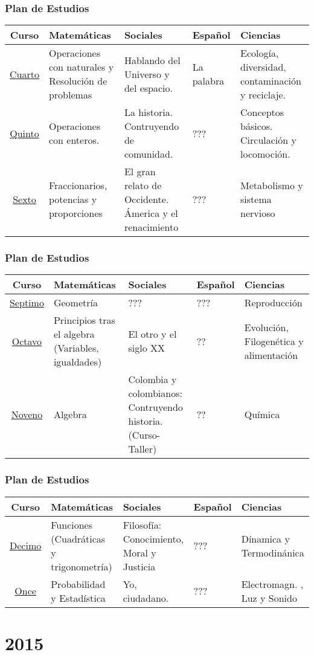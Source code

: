 \documentclass{beamer}
\begin{document}
\begin{frame}
\fontsize{9pt}{10}\selectfont
\frametitle{Plan de Estudios}
\begin{table}
\centering
\begin{tabular}{|c|p{2cm}|p{2cm}|p{2cm}|p{2cm}|}
\hline 
\textbf{Curso} & \textbf{Matem\'aticas} &\textbf{Sociales} &\textbf{Espa\~nol} & \textbf{Ciencias}\\
\hline
\underline{Cuarto} & Operaciones con naturales y Resoluci\'on de problemas   & Hablando del Universo y del espacio.  & La palabra & Ecolog\'ia, diversidad, contaminaci\'on y reciclaje.  \\
\underline{Quinto} & Operaciones con enteros.  & La historia. Contruyendo de comunidad. & ??? &Conceptos b\'asicos. Circulaci\'on y locomoci\'on.  \\
\underline{Sexto} & Fraccionarios, potencias y proporciones & El gran relato de Occidente. \'America y el renacimiento  & ??? & Metabolismo y sistema nervioso \\
\hline
\end{tabular}
\end{table}
\end{frame}


\begin{frame}
\fontsize{9pt}{10}\selectfont
\frametitle{Plan de Estudios}
\begin{table}
\centering
\begin{tabular}{|c|p{2cm}|p{2cm}|p{2cm}|p{2cm}|}
\hline 
\textbf{Curso} & \textbf{Matem\'aticas} &\textbf{Sociales} &\textbf{Espa\~nol} & \textbf{Ciencias}\\
\hline
\underline{Septimo} & Geometr\'ia & ??? & ???& Reproducci\'on \\
\underline{Octavo} & Principios tras el algebra (Variables, igualdades)  &El otro y el siglo XX & ??& Evoluci\'on, Filogen\'etica y  alimentaci\'on \\
\underline{Noveno} & Algebra & Colombia y colombianos: Contruyendo historia. (Curso-Taller)  & ??& Qu\'imica \\
\hline 
\end{tabular}
\end{table}
\end{frame}
\begin{frame}
\fontsize{9pt}{10}\selectfont
\frametitle{Plan de Estudios}
\begin{table}
\centering
\begin{tabular}{|c|p{2cm}|p{2cm}|p{2cm}|p{2cm}|}
\hline 
\textbf{Curso} & \textbf{Matem\'aticas} &\textbf{Sociales} &\textbf{Espa\~nol} & \textbf{Ciencias}\\
\hline
\underline{Decimo} & Funciones (Cuadr\'aticas y trigonometr\'ia)  & Filosof\'ia: Conocimiento, Moral y Justicia & ???& D\'inamica y Termodin\'anica\\
\underline{Once} & Probabilidad y Estad\'istica & Yo, ciudadano. & ??? & Electromagn. , Luz y Sonido \\
\hline 
\end{tabular}
\end{table}
\end{frame}
\section{2015}
\end{document}
